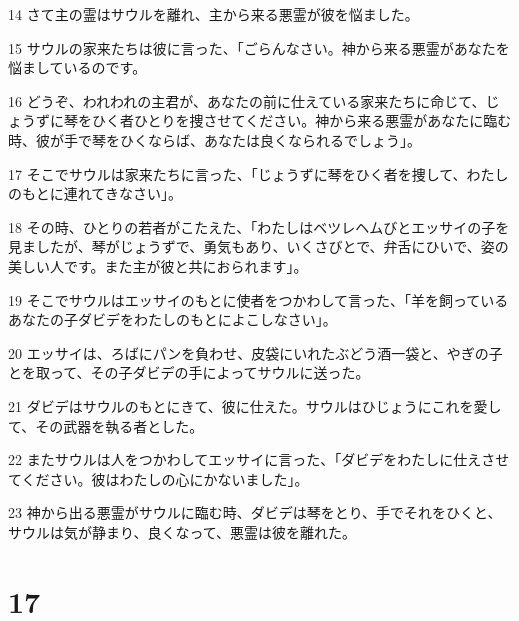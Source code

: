 \par 14 さて主の霊はサウルを離れ、主から来る悪霊が彼を悩ました。
\par 15 サウルの家来たちは彼に言った、「ごらんなさい。神から来る悪霊があなたを悩ましているのです。
\par 16 どうぞ、われわれの主君が、あなたの前に仕えている家来たちに命じて、じょうずに琴をひく者ひとりを捜させてください。神から来る悪霊があなたに臨む時、彼が手で琴をひくならば、あなたは良くなられるでしょう」。
\par 17 そこでサウルは家来たちに言った、「じょうずに琴をひく者を捜して、わたしのもとに連れてきなさい」。
\par 18 その時、ひとりの若者がこたえた、「わたしはベツレヘムびとエッサイの子を見ましたが、琴がじょうずで、勇気もあり、いくさびとで、弁舌にひいで、姿の美しい人です。また主が彼と共におられます」。
\par 19 そこでサウルはエッサイのもとに使者をつかわして言った、「羊を飼っているあなたの子ダビデをわたしのもとによこしなさい」。
\par 20 エッサイは、ろばにパンを負わせ、皮袋にいれたぶどう酒一袋と、やぎの子とを取って、その子ダビデの手によってサウルに送った。
\par 21 ダビデはサウルのもとにきて、彼に仕えた。サウルはひじょうにこれを愛して、その武器を執る者とした。
\par 22 またサウルは人をつかわしてエッサイに言った、「ダビデをわたしに仕えさせてください。彼はわたしの心にかないました」。
\par 23 神から出る悪霊がサウルに臨む時、ダビデは琴をとり、手でそれをひくと、サウルは気が静まり、良くなって、悪霊は彼を離れた。

\chapter{17}

